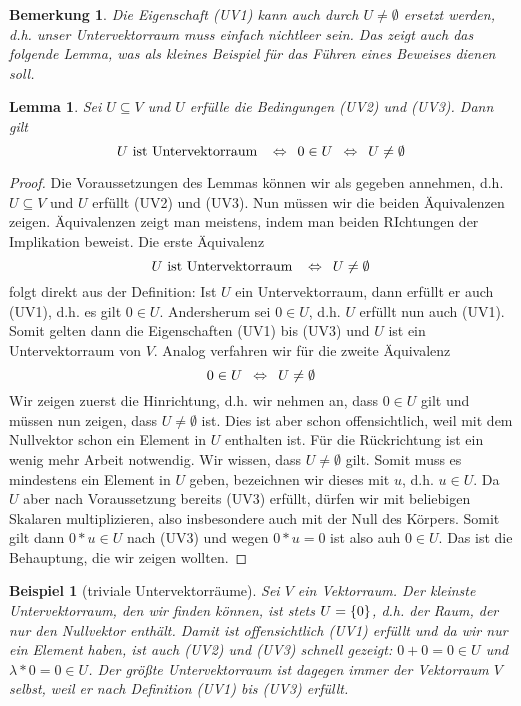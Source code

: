 \documentclass[ngerman, a4paper, 12pt]{article}
\newcounter{themcount}
\theoremstyle{plain}
\newtheorem{lemma}[themcount]{Lemma}
\newtheorem{beispiel}[themcount]{Beispiel}
\newtheorem{bemerkung}[themcount]{Bemerkung}
\theoremstyle{nonumberplain}
\newtheorem{proof}{Beweis}
\begin{document}
	\begin{bemerkung}
		Die Eigenschaft (UV1) kann auch durch $U \neq \emptyset$ ersetzt werden, d.h. unser Untervektorraum muss einfach nichtleer sein. Das zeigt auch das folgende Lemma, was als kleines Beispiel für das Führen eines Beweises dienen soll.
	\end{bemerkung}

	\begin{lemma}
		Sei $U \subseteq V$ und $U$ erfülle die Bedingungen (UV2) und (UV3). Dann gilt 
		\begin{equation*}
			U \text{ ist Untervektorraum } \enskip \Leftrightarrow \enskip 0 \in U  \enskip \Leftrightarrow \enskip U \neq \emptyset
		\end{equation*}
	\end{lemma}
	\begin{proof}
		Die Voraussetzungen des Lemmas können wir als gegeben annehmen, d.h. $U \subseteq V$ und $U$ erfüllt (UV2) und (UV3). Nun müssen wir die beiden Äquivalenzen zeigen. Äquivalenzen zeigt man meistens, indem man beiden RIchtungen der Implikation beweist. Die erste Äquivalenz
		\begin{equation*}
			U \text{ ist Untervektorraum } \enskip \Leftrightarrow \enskip U \neq \emptyset
		\end{equation*}
		folgt direkt aus der Definition: Ist $U$ ein Untervektorraum, dann erfüllt er auch (UV1), d.h. es gilt $0 \in U$. Andersherum sei $0 \in U$, d.h. $U$ erfüllt nun auch (UV1). Somit gelten dann die Eigenschaften (UV1) bis (UV3) und $U$ ist ein Untervektorraum von $V$. Analog verfahren wir für die zweite Äquivalenz
		\begin{equation*}
			0 \in U  \enskip \Leftrightarrow \enskip U \neq \emptyset
		\end{equation*}
		Wir zeigen zuerst die Hinrichtung, d.h. wir nehmen an, dass $0 \in U$ gilt und müssen nun zeigen, dass $U \neq \emptyset$ ist. Dies ist aber schon offensichtlich, weil mit dem Nullvektor schon ein Element in $U$ enthalten ist. Für die Rückrichtung ist ein wenig mehr Arbeit notwendig. Wir wissen, dass $U \neq \emptyset$ gilt. Somit muss es mindestens ein Element in $U$ geben, bezeichnen wir dieses mit $u$, d.h. $u \in U$. Da $U$ aber nach Voraussetzung bereits (UV3) erfüllt, dürfen wir mit beliebigen Skalaren multiplizieren, also insbesondere auch mit der Null des Körpers. Somit gilt dann $0 * u \in U$ nach (UV3) und wegen $0 * u = 0$ ist also auh $0 \in U$. Das ist die Behauptung, die wir zeigen wollten.
	\end{proof}

	\begin{beispiel}[triviale Untervektorräume]
		Sei $V$ ein Vektorraum. Der kleinste Untervektorraum, den wir finden können, ist stets $U = \left\{ 0 \right\}$, d.h. der Raum, der nur den Nullvektor enthält. Damit ist offensichtlich (UV1) erfüllt und da wir nur ein Element haben, ist auch (UV2) und (UV3) schnell gezeigt: $0 + 0 = 0 \in U$ und $\lambda * 0 = 0 \in U$.
		Der größte Untervektorraum ist dagegen immer der Vektorraum $V$ selbst, weil er nach Definition (UV1) bis (UV3) erfüllt.
	\end{beispiel}
\end{document}
